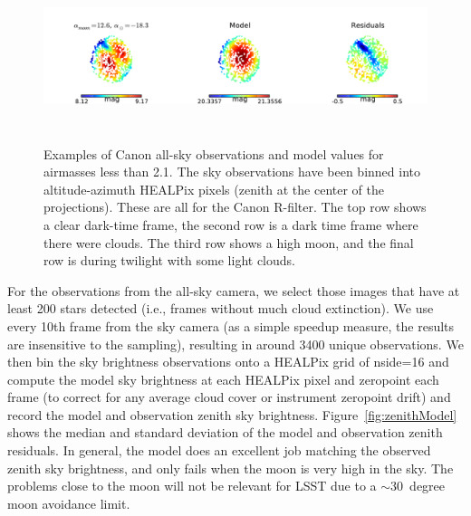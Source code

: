 \documentclass[]{spie}
\begin{document}
\begin{figure}[ht]
\begin{center}
  \includegraphics[height=5cm]{plots/exampleSkys_3.pdf}
  \end{center}
  \caption{Examples of Canon all-sky observations and model values for airmasses less than 2.1. The sky observations have been binned into altitude-azimuth HEALPix pixels (zenith at the center of the projections). These are all for the Canon R-filter. The top row shows a clear dark-time frame, the second row is a dark time frame where there were clouds. The third row shows a high moon, and the final row is during twilight with some light clouds. \label{fig:skyExamples}}
\end{figure}


For the observations from the all-sky camera, we select those images that have at least 200 stars detected  (i.e., frames without much cloud extinction). We use every 10th frame from the sky camera (as a simple speedup measure, the results are insensitive to the sampling), resulting in around 3400 unique observations.  We then bin the sky brightness observations onto a HEALPix grid of nside=16 and compute the model sky brightness at each HEALPix pixel and zeropoint each frame (to correct for any average cloud cover or instrument zeropoint drift) and record the model and observation zenith sky brightness. Figure~\ref{fig:zenithModel} shows the median and standard deviation of the model and observation zenith residuals.  In general, the model does an excellent job matching the observed zenith sky brightness, and only fails when the moon is very high in the sky.  The problems close to the moon will not be relevant for LSST due to a $\sim30$\ degree moon avoidance limit.
\end{document}
